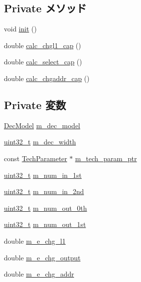 \subsection*{Private メソッド}
\begin{DoxyCompactItemize}
\item 
void \hyperlink{classDecoderUnit_a02fd73d861ef2e4aabb38c0c9ff82947}{init} ()
\item 
double \hyperlink{classDecoderUnit_abcf1816aefe7bb7487cc90b9b3eff418}{calc\_\-chgl1\_\-cap} ()
\item 
double \hyperlink{classDecoderUnit_a874bd4e177d9811be815cbf21521c785}{calc\_\-select\_\-cap} ()
\item 
double \hyperlink{classDecoderUnit_a22285c76512432112703b7a761841c3e}{calc\_\-chgaddr\_\-cap} ()
\end{DoxyCompactItemize}
\subsection*{Private 変数}
\begin{DoxyCompactItemize}
\item 
\hyperlink{classDecoderUnit_a3dfab203c31b5869c76011da4dfea555}{DecModel} \hyperlink{classDecoderUnit_abd501dedc575169d631cb18d20bc39f0}{m\_\-dec\_\-model}
\item 
\hyperlink{Type_8hh_a435d1572bf3f880d55459d9805097f62}{uint32\_\-t} \hyperlink{classDecoderUnit_a39591ac9b5e4bf6d85945260f52053e7}{m\_\-dec\_\-width}
\item 
const \hyperlink{classTechParameter}{TechParameter} $\ast$ \hyperlink{classDecoderUnit_a11d1644aa2bfe0e16783dface6fadf13}{m\_\-tech\_\-param\_\-ptr}
\item 
\hyperlink{Type_8hh_a435d1572bf3f880d55459d9805097f62}{uint32\_\-t} \hyperlink{classDecoderUnit_a4e524a5990ab89f9897d3b712841f804}{m\_\-num\_\-in\_\-1st}
\item 
\hyperlink{Type_8hh_a435d1572bf3f880d55459d9805097f62}{uint32\_\-t} \hyperlink{classDecoderUnit_a966f2911868cfbf619447be7d7bf9b92}{m\_\-num\_\-in\_\-2nd}
\item 
\hyperlink{Type_8hh_a435d1572bf3f880d55459d9805097f62}{uint32\_\-t} \hyperlink{classDecoderUnit_a94b1781415b831d43d30f2fd5abda267}{m\_\-num\_\-out\_\-0th}
\item 
\hyperlink{Type_8hh_a435d1572bf3f880d55459d9805097f62}{uint32\_\-t} \hyperlink{classDecoderUnit_aa18c8ca6786b8e752266336f6ef7e5d4}{m\_\-num\_\-out\_\-1st}
\item 
double \hyperlink{classDecoderUnit_ad43e27d3502cb557f9a9f3e96ab3f394}{m\_\-e\_\-chg\_\-l1}
\item 
double \hyperlink{classDecoderUnit_a931dc191a13c83d323b4665ac8f0c228}{m\_\-e\_\-chg\_\-output}
\item 
double \hyperlink{classDecoderUnit_a8105847e6786bfc7de82ecde3461bc72}{m\_\-e\_\-chg\_\-addr}
\end{DoxyCompactItemize}


